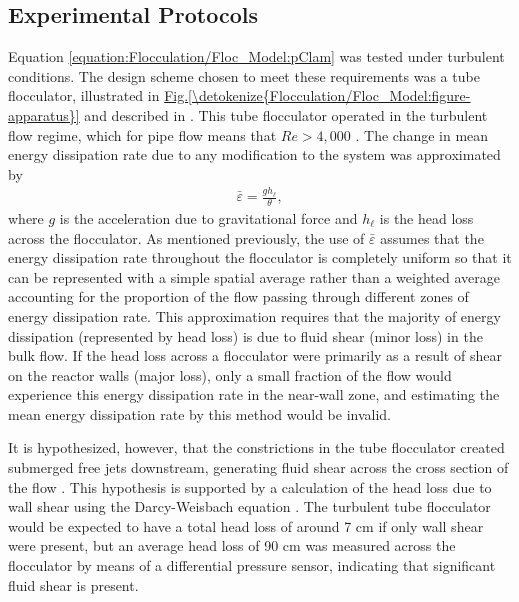 \documentclass[letterpaper,10pt,english]{sphinxmanual}
\begin{document}
\subsection{Experimental Protocols}
\label{\detokenize{Flocculation/Floc_Model:experimental-protocols}}
Equation \eqref{equation:Flocculation/Floc_Model:pClam} was tested under turbulent conditions. The design scheme chosen to meet these requirements was a tube flocculator, illustrated in \hyperref[\detokenize{Flocculation/Floc_Model:figure-apparatus}]{Fig.\@ \ref{\detokenize{Flocculation/Floc_Model:figure-apparatus}}} and described in \label{\detokenize{Flocculation/Floc_Model:id8}}{\hyperref[\detokenize{Flocculation/Floc_Model:floc-model-pennock-theoretical-2016}]{\sphinxcrossref{{[}PCWSL16{]}}}}. This tube flocculator operated in the turbulent flow regime, which for pipe flow means that \(Re>4,000\) \label{\detokenize{Flocculation/Floc_Model:id9}}{\hyperref[\detokenize{Flocculation/Floc_Model:floc-model-granger-fluid-1995}]{\sphinxcrossref{{[}Gra95{]}}}}. The change in mean energy dissipation rate due to any modification to the system was approximated by
\begin{equation}\label{equation:Flocculation/Floc_Model:EDR}
\begin{split}      \bar{\varepsilon}=\frac{gh_\ell}{\theta},\end{split}
\end{equation}
where \(g\) is the acceleration due to gravitational force and \(h_\ell\) is the head loss across the flocculator. As mentioned previously, the use of \(\bar{\varepsilon}\) assumes that the energy dissipation rate throughout the flocculator is completely uniform so that it can be represented with a simple spatial average rather than a weighted average accounting for the proportion of the flow passing through different zones of energy dissipation rate. This approximation requires that the majority of energy dissipation (represented by head loss) is due to fluid shear (minor loss) in the bulk flow. If the head loss across a flocculator were primarily as a result of shear on the reactor walls (major loss), only a small fraction of the flow would experience this energy dissipation rate in the near-wall zone, and estimating the mean energy dissipation rate by this method would be invalid.

It is hypothesized, however, that the constrictions in the tube flocculator created submerged free jets downstream, generating fluid shear across the cross section of the flow \label{\detokenize{Flocculation/Floc_Model:id10}}{\hyperref[\detokenize{Flocculation/Floc_Model:floc-model-pennock-theoretical-2016}]{\sphinxcrossref{{[}PCWSL16{]}}}}. This hypothesis is supported by a calculation of the head loss due to wall shear using the Darcy-Weisbach equation \label{\detokenize{Flocculation/Floc_Model:id11}}{\hyperref[\detokenize{Flocculation/Floc_Model:floc-model-granger-fluid-1995}]{\sphinxcrossref{{[}Gra95{]}}}}. The turbulent tube flocculator would be expected to have a total head loss of around 7 cm if only wall shear were present, but an average head loss of 90 cm was measured across the flocculator by means of a differential pressure sensor, indicating that significant fluid shear is present.
\end{document}
